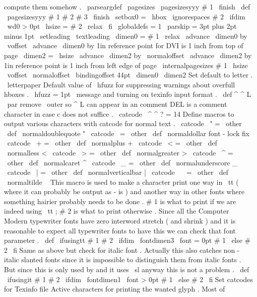 {{{{compute
them
somehow
.
%
\
parseargdef
\
pagesizes
{
\
pagesizesyyy
#
1
\
finish
}
\
def
\
pagesizesyyy
#
1
#
2
#
3
\
finish
{
{
%
\
setbox0
=
\
hbox
{
\
ignorespaces
#
2
}
\
ifdim
\
wd0
>
0pt
\
hsize
=
#
2
\
relax
\
fi
\
globaldefs
=
1
%
\
parskip
=
3pt
plus
2pt
minus
1pt
\
setleading
{
\
textleading
}
%
%
\
dimen0
=
#
1
\
relax
\
advance
\
dimen0
by
\
voffset
\
advance
\
dimen0
by
1in
%
reference
point
for
DVI
is
1
inch
from
top
of
page
%
\
dimen2
=
\
hsize
\
advance
\
dimen2
by
\
normaloffset
\
advance
\
dimen2
by
1in
%
reference
point
is
1
inch
from
left
edge
of
page
%
\
internalpagesizes
{
#
1
}
{
\
hsize
}
%
{
\
voffset
}
{
\
normaloffset
}
%
{
\
bindingoffset
}
{
44pt
}
%
{
\
dimen0
}
{
\
dimen2
}
%
}
}
%
Set
default
to
letter
.
%
\
letterpaper
%
Default
value
of
\
hfuzz
for
suppressing
warnings
about
overfull
hboxes
.
\
hfuzz
=
1pt
\
message
{
and
turning
on
texinfo
input
format
.
}
\
def
^
^
L
{
\
par
}
%
remove
\
outer
so
^
L
can
appear
in
an
comment
%
DEL
is
a
comment
character
in
case
c
does
not
suffice
.
\
catcode
\
^
^
?
=
14
%
Define
macros
to
output
various
characters
with
catcode
for
normal
text
.
\
catcode
\
"
=
\
other
\
def
\
normaldoublequote
{
"
}
\
catcode
\
=
\
other
\
def
\
normaldollar
{
}
%
font
-
lock
fix
\
catcode
\
+
=
\
other
\
def
\
normalplus
{
+
}
\
catcode
\
<
=
\
other
\
def
\
normalless
{
<
}
\
catcode
\
>
=
\
other
\
def
\
normalgreater
{
>
}
\
catcode
\
^
=
\
other
\
def
\
normalcaret
{
^
}
\
catcode
\
_
=
\
other
\
def
\
normalunderscore
{
_
}
\
catcode
\
|
=
\
other
\
def
\
normalverticalbar
{
|
}
\
catcode
\
~
=
\
other
\
def
\
normaltilde
{
~
}
%
This
macro
is
used
to
make
a
character
print
one
way
in
\
tt
%
(
where
it
can
probably
be
output
as
-
is
)
and
another
way
in
other
fonts
%
where
something
hairier
probably
needs
to
be
done
.
%
%
#
1
is
what
to
print
if
we
are
indeed
using
\
tt
;
#
2
is
what
to
print
%
otherwise
.
Since
all
the
Computer
Modern
typewriter
fonts
have
zero
%
interword
stretch
(
and
shrink
)
and
it
is
reasonable
to
expect
all
%
typewriter
fonts
to
have
this
we
can
check
that
font
parameter
.
%
\
def
\
ifusingtt
#
1
#
2
{
\
ifdim
\
fontdimen3
\
font
=
0pt
#
1
\
else
#
2
\
fi
}
%
Same
as
above
but
check
for
italic
font
.
Actually
this
also
catches
%
non
-
italic
slanted
fonts
since
it
is
impossible
to
distinguish
them
from
%
italic
fonts
.
But
since
this
is
only
used
by
and
it
uses
\
sl
anyway
%
this
is
not
a
problem
.
\
def
\
ifusingit
#
1
#
2
{
\
ifdim
\
fontdimen1
\
font
>
0pt
#
1
\
else
#
2
\
fi
}
%
Set
catcodes
for
Texinfo
file
%
Active
characters
for
printing
the
wanted
glyph
.
%
Most
of
}}}}
